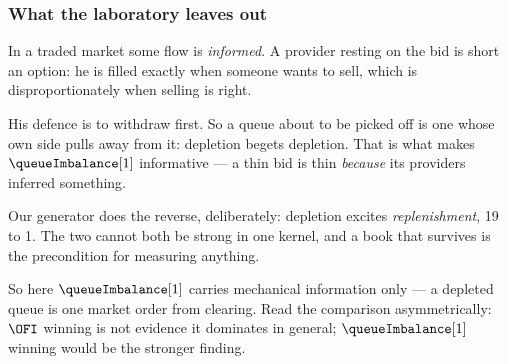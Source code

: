 \begin{frame}
  \frametitle{What the laboratory leaves out}
In a traded market some flow is \emph{informed}.
A provider resting on the bid is short an option:
he is filled exactly when someone wants to sell, which is disproportionately when selling
is right.

His defence is to withdraw first.
So a queue about to be picked off is one whose own side pulls away from it:
\alert{depletion begets depletion}.
That is what makes $\queueImbalance[1]$ informative --- a thin bid is thin \emph{because}
its providers inferred something.

Our generator does the reverse, deliberately: depletion excites \emph{replenishment},
19 to 1.
The two cannot both be strong in one kernel, and a book that survives is the precondition
for measuring anything.

So here $\queueImbalance[1]$ carries \alert{mechanical} information only ---
a depleted queue is one market order from clearing.
Read the comparison asymmetrically:
$\OFI$ winning is not evidence it dominates in general;
$\queueImbalance[1]$ winning would be the stronger finding.
\end{frame}
